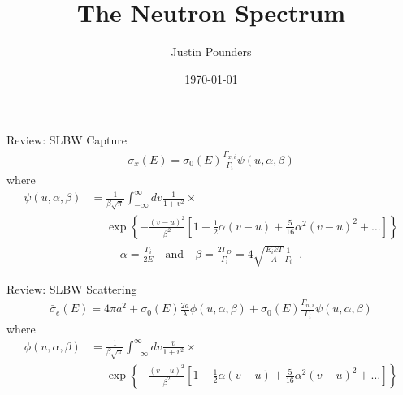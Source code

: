 \documentclass[presentation]{beamer}
\author{Justin Pounders}
\date{\today}
\title{The Neutron Spectrum}
\begin{document}
\maketitle

\begin{frame}[label={sec:orgheadline1}]{Review: SLBW Capture}
\begin{align*}
  \bar{\sigma}_x(E) = \sigma_0(E) \frac{\Gamma_{x,i}}{\Gamma_i} \psi(u,\alpha,\beta)
\end{align*}
where
\begin{align*}
  \psi(u,\alpha,\beta) &= \frac{1}{\beta\sqrt{\pi}}
                         \int_{-\infty}^\infty dv \frac{1}{1+v^2} \times \\
                       &\phantom{=}  \exp\left\{ -\frac{(v-u)^2}{\beta^2}
                         \left[ 1 - \frac{1}{2}\alpha(v-u) + \frac{5}{16}\alpha^2(v-u)^2 + \hdots \right] \right\}
\end{align*}
\begin{align*}
  \alpha = \frac{\Gamma_i}{2E}
  \quad \text{and} \quad
  \beta = \frac{2\Gamma_D}{\Gamma_i} = 4 \sqrt{\frac{E_i kT}{A}} \frac{1}{\Gamma_i} \;\;.
\end{align*}
\end{frame}
\begin{frame}[label={sec:orgheadline2}]{Review: SLBW Scattering}
\begin{align}
  \bar{\sigma}_e(E) = 4\pi a^2 + \sigma_0(E)\frac{2a}{\lambda}\phi(u,\alpha,\beta) + \sigma_0(E)\frac{\Gamma_{n,i}}{\Gamma_i}\psi(u,\alpha,\beta)
\end{align}
where
\begin{align}
  \phi(u,\alpha,\beta) &= \frac{1}{\beta\sqrt{\pi}}
                         \int_{-\infty}^\infty dv \frac{v}{1+v^2} \times \\
                       &\phantom{=} \exp\left\{ -\frac{(v-u)^2}{\beta^2}
                         \left[ 1 - \frac{1}{2}\alpha(v-u) + \frac{5}{16}\alpha^2(v-u)^2 + \hdots \right] \right\}
\end{align}
\end{frame}
\end{document}
